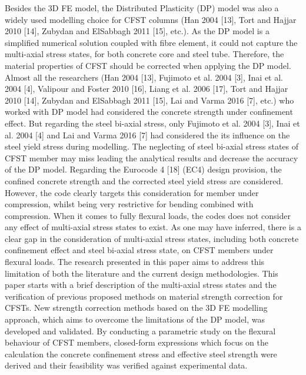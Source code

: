 \documentclass[12pt, A4]{article}
\begin{document}
	Besides the 3D FE model, the Distributed Plasticity (DP) model was also a widely used modelling choice for CFST columns (Han 2004 [13], Tort and Hajjar 2010 [14], Zubydan and ElSabbagh 2011 [15], etc.). As the DP model is a simplified numerical solution coupled with fibre element, it could not capture the multi-axial stress states, for both concrete core and steel tube. Therefore, the material properties of CFST should be corrected when applying the DP model. Almost all the researchers (Han 2004 [13], Fujimoto et al. 2004 [3], Inai et al. 2004 [4], Valipour and Foster 2010 [16], Liang et al. 2006 [17], Tort and Hajjar 2010 [14], Zubydan and ElSabbagh 2011 [15], Lai and Varma 2016 [7], etc.) who worked with DP model had considered the concrete strength under confinement effect. But regarding the steel bi-axial stress, only Fujimoto et al. 2004 [3], Inai et al. 2004 [4] and Lai and Varma 2016 [7] had considered the its influence on the steel yield stress during modelling. The neglecting of steel bi-axial stress states of CFST member may miss leading the analytical results and decrease the accuracy of the DP model.
	Regarding the Eurocode 4 [18] (EC4) design provision, the confined concrete strength and the corrected steel yield stress are considered. However, the code clearly targets this consideration for member under compression, whilst being very restrictive for bending combined with compression. When it comes to fully flexural loads, the codes does not consider any effect of multi-axial stress states to exist.
	As one may have inferred, there is a clear gap in the consideration of multi-axial stress states, including both concrete confinement effect and steel bi-axial stress state, on CFST members under flexural loads. The research presented in this paper aims to address this limitation of both the literature and the current design methodologies. This paper starts with a brief description of the multi-axial stress states and the verification of previous proposed methods on material strength correction for CFSTs. New strength correction methods based on the 3D FE modelling approach, which aims to overcome the limitations of the DP model, was developed and validated. By conducting a parametric study on the flexural behaviour of CFST members, closed-form expressions which focus on the calculation the concrete confinement stress and effective steel strength were derived and their feasibility was verified against experimental data. 
	
	
	
\end{document}
